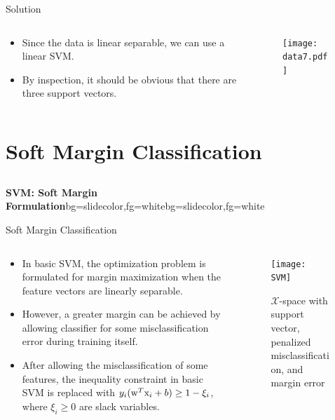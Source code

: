\begin{frame}{Solution}
\begin{columns}
\begin{column}{7cm}
\begin{itemize}
\item Since the data is linear separable, we can use a linear SVM.
\item By inspection, it should be obvious that there are three support vectors.
\end{itemize}
\end{column}
\begin{column}{7cm}
\begin{figure}
\texttt{[image: data7.pdf]}
\end{figure}
\end{column}
\end{columns}
\end{frame}

\section{Soft Margin Classification}
\subsection{}
\begin{frame}{}
\begin{variableblock}{\centering \Large \textbf{\vspace{4pt}\newline SVM: Soft Margin Formulation\vspace{4pt}}}{bg=slidecolor,fg=white}{bg=slidecolor,fg=white}
\end{variableblock}
\end{frame}

\begin{frame}{Soft Margin Classification}
\begin{columns}
\begin{column}{7cm}
\begin{itemize}
\item In basic SVM, the optimization problem is formulated for margin maximization when the feature vectors are linearly separable. 
\item However, a greater margin can be achieved by {\color{mycolor2}allowing classifier for some misclassification error} during training itself.
\item After allowing the misclassification of some features, the inequality constraint in basic SVM is replaced with ${y_i}({ {\rm w}^T}{\rm x}_i + b) \ge 1-\xi _i$, where $\xi _i\geq 0$ are {\color{mycolor2}slack variables}.
\end{itemize}
\end{column}
\begin{column}{7cm}
\begin{figure}[htbp]
\centering
\texttt{[image: SVM]}
\caption{$\mathcal{X}$-space with support vector, penalized misclassification, and margin error}
\end{figure}
\end{column}
\end{columns}
\end{frame}

